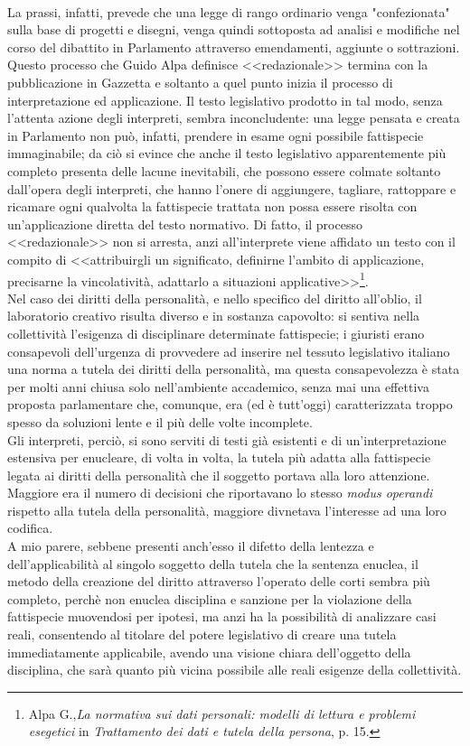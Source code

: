 \\La prassi, infatti, prevede che una legge di rango ordinario venga "confezionata" sulla base di progetti e disegni, venga quindi sottoposta ad analisi e modifiche  nel corso del dibattito in Parlamento attraverso emendamenti, aggiunte o sottrazioni. Questo processo che Guido Alpa definisce <<redazionale>> termina con la pubblicazione in Gazzetta e soltanto a quel punto inizia il processo di interpretazione ed applicazione.
Il testo legislativo prodotto in tal modo, senza l'attenta azione degli interpreti, sembra inconcludente: una legge pensata e creata in Parlamento non può, infatti, prendere in esame ogni possibile fattispecie immaginabile; da ciò si evince che anche il testo legislativo apparentemente più completo presenta delle lacune inevitabili, che possono essere colmate soltanto dall'opera degli interpreti, che hanno l'onere di aggiungere, tagliare, rattoppare e ricamare ogni qualvolta la fattispecie trattata non possa essere risolta con un'applicazione diretta del testo normativo.
Di fatto, il processo <<redazionale>> non si arresta, anzi all'interprete viene affidato un testo con il compito di <<attribuirgli un significato, definirne l'ambito di applicazione, precisarne la vincolatività, adattarlo a situazioni applicative>>\footnote{Alpa G.,\textit{La normativa sui dati personali: modelli di lettura e problemi esegetici} in \textit{Trattamento dei dati e tutela della persona}, p. 15.}.
\\Nel caso dei diritti della personalità, e nello specifico del diritto all'oblio, il laboratorio creativo risulta diverso e in sostanza capovolto: si sentiva nella collettività l'esigenza di disciplinare determinate fattispecie; i giuristi erano consapevoli dell'urgenza di provvedere ad inserire nel tessuto legislativo italiano una norma a tutela dei diritti della personalità, ma questa consapevolezza è stata per molti anni chiusa solo nell'ambiente accademico, senza mai una effettiva proposta parlamentare che, comunque, era (ed è tutt'oggi) caratterizzata troppo spesso da soluzioni lente e il più delle volte incomplete.
\\Gli interpreti, perciò, si sono serviti di testi già esistenti e di un'interpretazione estensiva per enucleare, di volta in volta, la tutela più adatta alla fattispecie legata ai diritti della personalità che il soggetto portava alla loro attenzione.
Maggiore era il numero di decisioni che riportavano lo stesso \textit{modus operandi} rispetto alla tutela della personalità, maggiore divnetava l'interesse ad una loro codifica.
\\A mio parere, sebbene presenti anch'esso il difetto della  lentezza e dell'applicabilità al singolo soggetto della tutela che la sentenza enuclea,  il metodo della creazione del diritto attraverso l'operato delle corti sembra più completo, perchè non enuclea disciplina e sanzione per la violazione della fattispecie muovendosi per ipotesi, ma anzi ha la possibilità di analizzare casi reali, consentendo al titolare del potere legislativo di creare una tutela immediatamente applicabile, avendo una visione chiara dell'oggetto della disciplina, che sarà quanto più vicina possibile alle reali esigenze della collettività.


